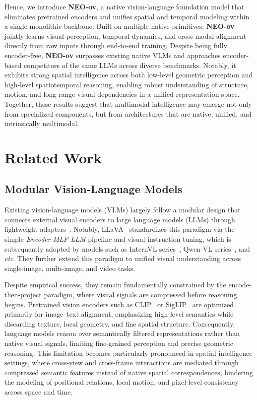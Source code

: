 \documentclass[11pt]{article}
\newcommand{\etc}{\textit{etc}}
\begin{document}
Hence, we introduce \textbf{NEO-ov}, a native vision-language foundation model that eliminates pretrained encoders and unifies spatial and temporal modeling within a single monolithic backbone. 
%
Built on multiple native primitives, \textbf{NEO-ov} jointly learns visual perception, temporal dynamics, and cross-modal alignment directly from raw inputs through end-to-end training.
%
Despite being fully encoder-free, \textbf{NEO-ov} surpasses existing native VLMs and approaches encoder-based competitors of the same LLMs across diverse benchmarks. 
%
Notably, it exhibits strong spatial intelligence across both low-level geometric perception and high-level spatiotemporal reasoning, enabling robust understanding of structure, motion, and long-range visual dependencies in a unified representation space.
%
Together, these results suggest that multimodal intelligence may emerge not only from specialized components, but from architectures that are native, unified, and intrinsically multimodal.





\section{Related Work}
\subsection{Modular Vision-Language Models}
Existing vision-language models (VLMs) largely follow a modular design that connects external visual encoders to large language models (LLMs) through lightweight adapters~\cite{VLP:Flamingo,VLM:InstructBLIP}. Notably, LLaVA~\cite{VLM:LLaVA,VLM:LLaVA-NeXT} standardizes this paradigm via the simple \textit{Encoder-MLP-LLM} pipeline and visual instruction tuning, which is subsequently adopted by models such as InternVL series~\cite{VLM:InternVL-2.5,VLM:InternVL-3,VLM:InternVL-3.5}, Qwen-VL series~\cite{VLM:Qwen2-VL,VLM:Qwen2.5-VL,VLM:Qwen3VL}, and \etc. 
They further extend this paradigm to unified visual understanding across single-image, multi-image, and video tasks.


Despite empirical success, they remain fundamentally constrained by the encode-then-project paradigm, where visual signals are compressed before reasoning begins. Pretrained vision encoders such as CLIP~\cite{VLP:CLIP} or SigLIP~\cite{VLP:SigLIP,VLP:SigLIP-2} are optimized primarily for image–text alignment, emphasizing high-level semantics while discarding texture, local geometry, and fine spatial structure. Consequently, language models reason over semantically filtered representations rather than native visual signals, limiting fine-grained perception and precise geometric reasoning. This limitation becomes particularly pronounced in spatial intelligence settings, where cross-view and cross-frame interactions are mediated through compressed semantic features instead of native spatial correspondences, hindering the modeling of positional relations, local motion, and pixel-level consistency across space and time.
\end{document}

